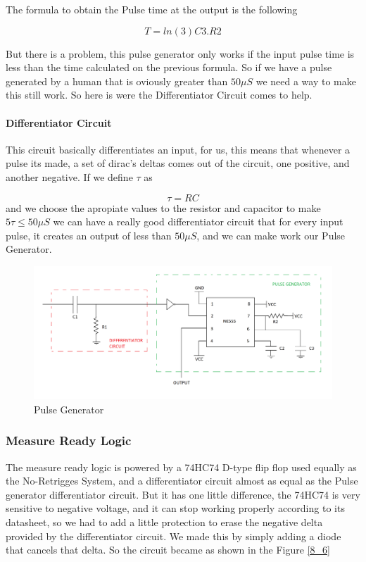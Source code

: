 The formula to obtain the Pulse time at the output is the following

\[
T=ln(3)C3.R2
\]

But there is a problem, this pulse generator only works if the input
pulse time is less than the time calculated on the previous formula.
So if we have a pulse generated by a human that is oviously greater
than $50\mu S$ we need a way to make this still work. So here is
were the Differentiator Circuit comes to help.

\paragraph{Differentiator Circuit}

This circuit basically differentiates an input, for us, this means
that whenever a pulse its made, a set of dirac's deltas comes out
of the circuit, one positive, and another negative. If we define $\tau$
as 

\[
\tau=RC
\]
 and we choose the apropiate values to the resistor and capacitor
to make $5\tau\leq50\mu S$ we can have a really good differentiator
circuit that for every input pulse, it creates an output of less than
$50\mu S$, and we can make work our Pulse Generator.

\begin{figure}[h!]
\begin{centering}
\includegraphics[scale=0.2]{../Exercise8/Informe/images/PULSE_GENERATOR}
\par\end{centering}
\caption{\color{cyan}Pulse Generator}
\label{8_5}
\end{figure}

\subsubsection{\color{red}Measure Ready Logic}

The measure ready logic is powered by a 74HC74 D-type flip flop used
equally as the No-Retrigges System, and a differentiator circuit almost
as equal as the Pulse generator differentiator circuit. But it has
one little difference, the 74HC74 is very sensitive to negative voltage,
and it can stop working properly according to its datasheet, so we
had to add a little protection to erase the negative delta provided
by the differentiator circuit. We made this by simply adding a diode
that cancels that delta. So the circuit became as shown in the Figure
\ref{8_6}

